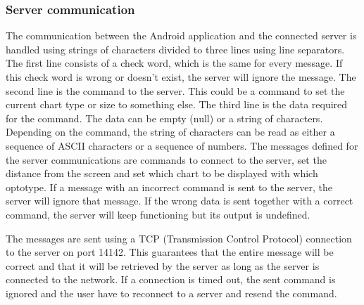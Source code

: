 \documentclass[12pt,a4paper,notitlepage]{report}
\begin{document}

\subsubsection{Server communication}
The communication between the Android application and the connected server is handled using strings of characters divided to three lines using line separators. The first line consists of a check word, which is the same for every message. If this check word is wrong or doesn't exist, the server will ignore the message. The second line is the command to the server. This could be a command to set the current chart type or size to something else. The third line is the data required for the command. The data can be empty (null) or a string of characters. Depending on the command, the string of characters can be read as either a sequence of ASCII characters or a sequence of numbers. The messages defined for the server communications are commands to connect to the server, set the distance from the screen and set which chart to be displayed with which optotype. If a message with an incorrect command is sent to the server, the server will ignore that message. If the wrong data is sent together with a correct command, the server will keep functioning but its output is undefined.

The messages are sent using a TCP (Transmission Control Protocol) connection to the server on port 14142. This guarantees that the entire message will be correct and that it will be retrieved by the server as long as the server is connected to the network. If a connection is timed out, the sent command is ignored and the user have to reconnect to a server and resend the command.

\end{document}
